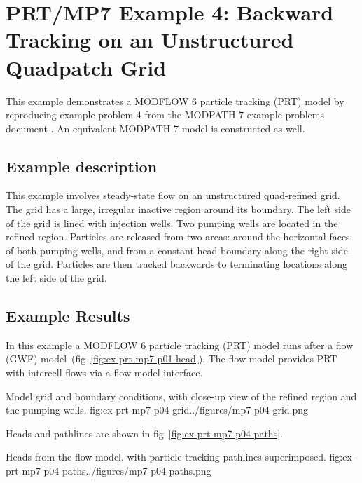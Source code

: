 \section{PRT/MP7 Example 4: Backward Tracking on an Unstructured Quadpatch Grid}

This example demonstrates a MODFLOW 6 particle tracking (PRT) model by reproducing example problem 4 from the MODPATH 7 \citep{pollock2016modpath7} example problems document \citep{modpath7examples}. An equivalent MODPATH 7 model is constructed as well.

\subsection{Example description}

This example involves steady-state flow on an unstructured quad-refined grid. The grid has a large, irregular inactive region around its boundary. The left side of the grid is lined with injection wells. Two pumping wells are located in the refined region. Particles are released from two areas: around the horizontal faces of both pumping wells, and from a constant head boundary along the right side of the grid. Particles are then tracked backwards to terminating locations along the left side of the grid.

\subsection{Example Results}

In this example a MODFLOW 6 particle tracking (PRT) model runs after a flow (GWF) model~(fig~\ref{fig:ex-prt-mp7-p01-head}). The flow model provides PRT with intercell flows via a flow model interface.

\begin{StandardFigure}{
    Model grid and boundary conditions, with close-up view of the refined region and the pumping wells.
    }{fig:ex-prt-mp7-p04-grid}{../figures/mp7-p04-grid.png}
\end{StandardFigure}

Heads and pathlines are shown in fig~\ref{fig:ex-prt-mp7-p04-paths}.

\begin{StandardFigure}{
    Heads from the flow model, with particle tracking pathlines superimposed.
    }{fig:ex-prt-mp7-p04-paths}{../figures/mp7-p04-paths.png}
\end{StandardFigure}